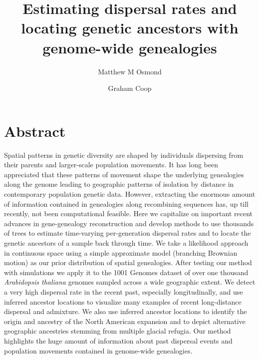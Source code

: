 \documentclass[12pt]{article}
\title{Estimating dispersal rates and locating genetic ancestors with genome-wide genealogies}
\author[1]{Matthew M Osmond}
\author[2]{Graham Coop}
\affil[1]{Department of Ecology \& Evolutionary Biology, University of Toronto}
\affil[2]{Department of Evolution \& Ecology and Center for Population Biology, University of California - Davis}
\date{}
\begin{document}

\maketitle

\section*{Abstract}

Spatial patterns in genetic diversity are shaped by individuals dispersing from their parents and larger-scale population movements. 
It has long been appreciated that these patterns of movement shape the underlying genealogies along the genome leading to geographic patterns of isolation by distance in contemporary population genetic data.
However, extracting the enormous amount of information contained in genealogies along recombining sequences has, up till recently, not been computational feasible.
Here we capitalize on important recent advances in gene-genealogy reconstruction and develop methods to use thousands of trees to estimate time-varying per-generation dispersal rates and to locate the genetic ancestors of a sample back through time.
We take a likelihood approach in continuous space using a simple approximate model (branching Brownian motion) as our prior distribution of spatial genealogies. 
After testing our method with simulations we apply it to the 1001 Genomes dataset of over one thousand \textit{Arabidopsis thaliana} genomes sampled across a wide geographic extent. 
We detect a very high dispersal rate in the recent past, especially longitudinally, and use inferred ancestor locations to visualize many examples of recent long-distance dispersal and admixture. 
We also use inferred ancestor locations to identify the origin and ancestry of the North American expansion and to depict alternative geographic ancestries stemming from multiple glacial refugia. 
Our method highlights the huge amount of information about past dispersal events and population movements contained in genome-wide genealogies.  
\end{document}
